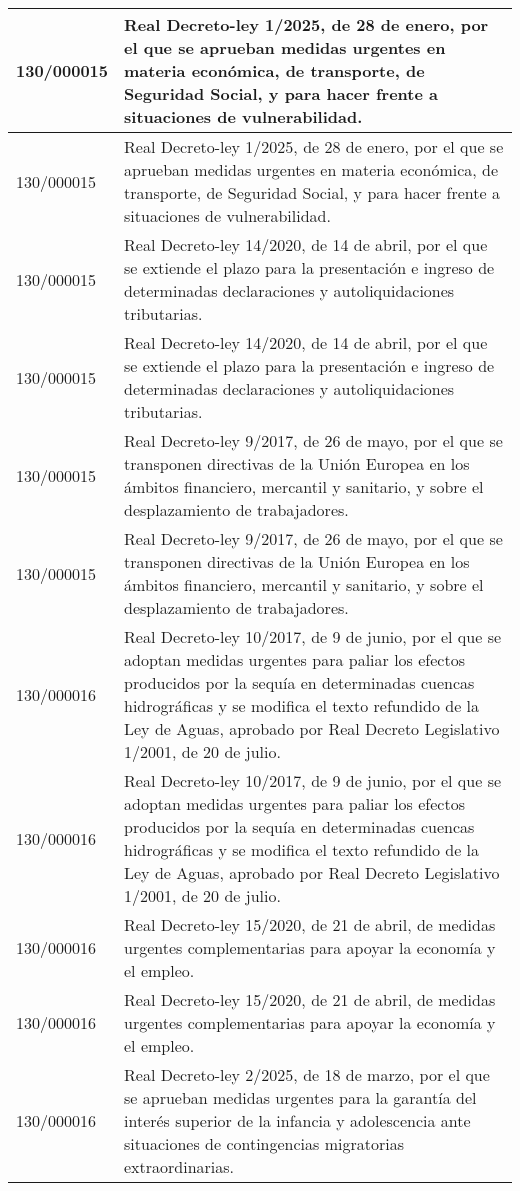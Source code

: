 {\begin{table}[H]
\begin{center}
\begin{tabularx}{\linewidth}{| l | X |}
\hline
130/000015 & Real Decreto-ley 1/2025, de 28 de enero, por el que se aprueban medidas urgentes en materia económica, de transporte, de Seguridad Social, y para hacer frente a situaciones de vulnerabilidad. \\
\hline
130/000015 & Real Decreto-ley 1/2025, de 28 de enero, por el que se aprueban medidas urgentes en materia económica, de transporte, de Seguridad Social, y para hacer frente a situaciones de vulnerabilidad. \\
\hline
130/000015 & Real Decreto-ley 14/2020, de 14 de abril, por el que se extiende el plazo para la presentación e ingreso de determinadas declaraciones y autoliquidaciones tributarias. \\
\hline
130/000015 & Real Decreto-ley 14/2020, de 14 de abril, por el que se extiende el plazo para la presentación e ingreso de determinadas declaraciones y autoliquidaciones tributarias. \\
\hline
130/000015 & Real Decreto-ley 9/2017, de 26 de mayo, por el que se transponen directivas de la Unión Europea en los ámbitos financiero, mercantil y sanitario, y sobre el desplazamiento de trabajadores. \\
\hline
130/000015 & Real Decreto-ley 9/2017, de 26 de mayo, por el que se transponen directivas de la Unión Europea en los ámbitos financiero, mercantil y sanitario, y sobre el desplazamiento de trabajadores. \\
\hline
130/000016 & Real Decreto-ley 10/2017, de 9 de junio, por el que se adoptan medidas urgentes para paliar los efectos producidos por la sequía en determinadas cuencas hidrográficas y se modifica el texto refundido de la Ley de Aguas, aprobado por Real Decreto Legislativo 1/2001, de 20 de julio. \\
\hline
130/000016 & Real Decreto-ley 10/2017, de 9 de junio, por el que se adoptan medidas urgentes para paliar los efectos producidos por la sequía en determinadas cuencas hidrográficas y se modifica el texto refundido de la Ley de Aguas, aprobado por Real Decreto Legislativo 1/2001, de 20 de julio. \\
\hline
130/000016 & Real Decreto-ley 15/2020, de 21 de abril, de medidas urgentes complementarias para apoyar la economía y el empleo. \\
\hline
130/000016 & Real Decreto-ley 15/2020, de 21 de abril, de medidas urgentes complementarias para apoyar la economía y el empleo. \\
\hline
130/000016 & Real Decreto-ley 2/2025, de 18 de marzo, por el que se aprueban medidas urgentes para la garantía del interés superior de la infancia y adolescencia ante situaciones de contingencias migratorias extraordinarias. \\

\end{tabularx}
\end{center}
\end{table}}
